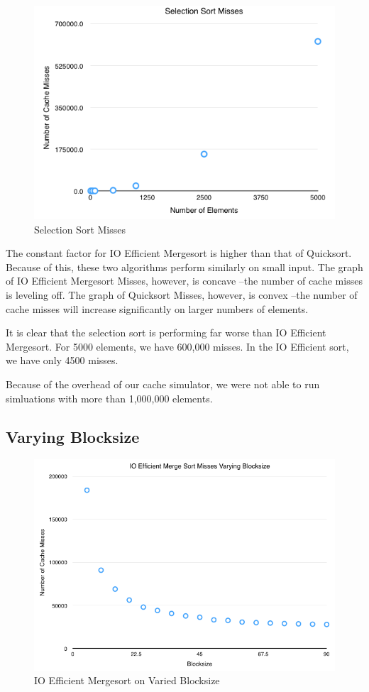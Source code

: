 \documentclass[11pt]{article}
\begin{document}
\begin{figure}[H]  
\includegraphics[scale=0.6]{figures/SelectionSortMisses.png}
\caption{Selection Sort Misses}
\label{listrankingio}
\end{figure}

The constant factor for IO Efficient Mergesort is higher than that of Quicksort. Because of this, these two algorithms perform similarly on small input. The graph of IO Efficient Mergesort Misses, however, is concave --the number of cache misses is leveling off. The graph of Quicksort Misses, however, is convex --the number of cache misses will increase significantly on larger numbers of elements.

It is clear that the selection sort is performing far worse than IO Efficient Mergesort. For 5000 elements, we have 600,000 misses. In the IO Efficient sort, we have only 4500 misses.

Because of the overhead of our cache simulator, we were not able to run simluations with more than 1,000,000 elements.

\subsection{Varying Blocksize}

\begin{figure}[H]  
\includegraphics[scale=0.45]{figures/Blocksize_IOEfficientMergeSort.png}
\caption{IO Efficient Mergesort on Varied Blocksize}
\label{listrankingio}
\end{figure}
\end{document}
